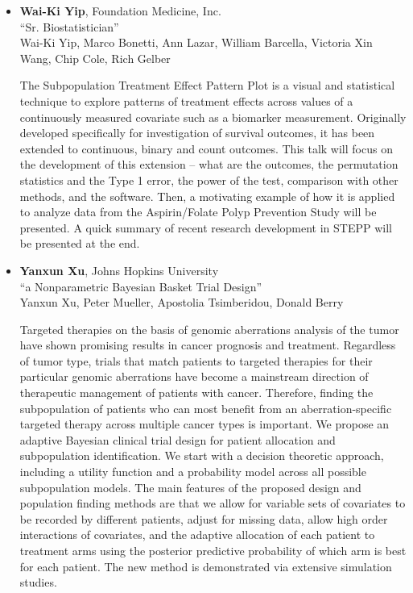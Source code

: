 \begin{itemize}
\item \textbf{Wai-Ki Yip}, Foundation Medicine, Inc. \\
``Sr. Biostatistician'' \\
Wai-Ki Yip, Marco Bonetti, Ann Lazar, William Barcella, Victoria Xin Wang, Chip Cole, Rich Gelber


The Subpopulation Treatment Effect Pattern Plot is a visual and statistical technique to explore patterns of treatment effects across values of a continuously measured covariate such as a biomarker measurement. Originally developed specifically for investigation of survival outcomes, it has been extended to continuous, binary and count outcomes.  This talk will focus on the development of this extension – what are the outcomes, the permutation statistics and the Type 1 error, the power of the test, comparison with other methods, and the software.  Then, a motivating example of how it is applied to analyze data from the Aspirin/Folate Polyp Prevention Study will be presented. 
A quick summary of recent research development in STEPP will be presented at the end.

\item \textbf{Yanxun Xu}, Johns Hopkins University \\
``a Nonparametric Bayesian Basket Trial Design'' \\
Yanxun Xu, Peter Mueller, Apostolia Tsimberidou, Donald Berry


Targeted therapies on the basis of genomic aberrations analysis of the tumor have shown promising results in cancer prognosis and treatment. Regardless of tumor type, trials that match patients to targeted therapies for their particular genomic aberrations have become a mainstream direction of therapeutic management of patients with cancer. Therefore, finding the subpopulation of patients who can most benefit from an aberration-specific targeted therapy across multiple cancer types is important. We propose an adaptive Bayesian clinical trial design for patient allocation and subpopulation identification. We start with a decision theoretic approach, including a utility function and a probability model across all
possible subpopulation models. The main features of the proposed design and population finding methods are that we allow for variable sets of covariates to be recorded by different patients, adjust for missing data, allow high order interactions of covariates, and the adaptive allocation of each patient to treatment arms using the posterior predictive probability of which arm is best for each patient. The new method is demonstrated via extensive simulation studies.


\end{itemize}
